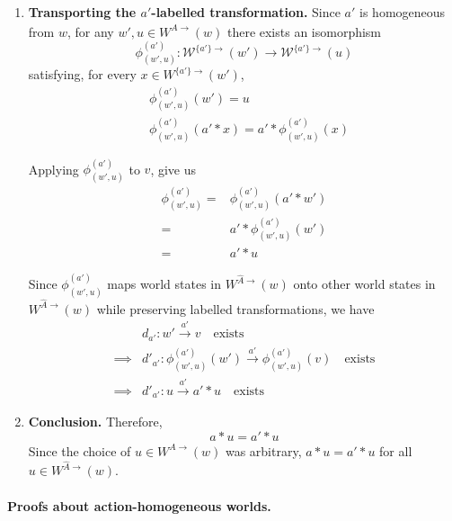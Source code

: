 \begin{proofE}
\begin{enumerate}[(1)]
    \item \textbf{Transporting the $a'$-labelled transformation.}
    Since $a'$ is homogeneous from $w$, for any $w', u \in W^{\hat{A}\to}(w)$ there exists an isomorphism
    \begin{equation}
        \phi_{(w', u)}^{(a')}: \mathscr{W}^{\{a'\}\to}(w') \to \mathscr{W}^{\{a'\}\to}(u)
    \end{equation}
    satisfying, for every $x \in W^{\{a'\}\to}(w')$,
    \begin{align}
        & \phi_{(w', u)}^{(a')}(w') = u \\
        & \phi_{(w', u)}^{(a')}(a' \ast x) = a' \ast \phi_{(w', u)}^{(a')}(x)
    \end{align}

    Applying $\phi^{(a')}_{(w', u)}$ to $v$, give us
    \begin{align}
        \phi^{(a')}_{(w', u)} = & \phi^{(a')}_{(w', u)}(a' \ast w') \\
        = & a' \ast \phi^{(a')}_{(w', u)}(w') \\
        = & a' \ast u
    \end{align}

    Since $\phi^{(a')}_{(w', u)}$ maps world states in $W^{\hat{A}\to}(w)$ onto other world states in $W^{\hat{A}\to}(w)$ while preserving labelled transformations, we have
    \begin{align}
        & d_{a'}: w' \xrightarrow{a'} v \quad \text{exists} \\
        \implies & d'_{a'}: \phi^{(a')}_{(w', u)}(w') \xrightarrow{a'} \phi^{(a')}_{(w', u)}(v) \quad \text{exists} \\
        \implies & d'_{a'}: u \xrightarrow{a'} a' \ast u \quad \text{exists}
    \end{align}

    \item \textbf{Conclusion.}
    Therefore,
    \begin{equation}
        a \ast u = a' \ast u
    \end{equation}
    Since the choice of $u \in W^{\hat{A}\to}(w)$ was arbitrary, $a \ast u = a' \ast u$ for all $u \in W^{\hat{A}\to}(w)$.
\end{enumerate}
\end{proofE}






\paragraph{Proofs about action-homogeneous worlds.}

